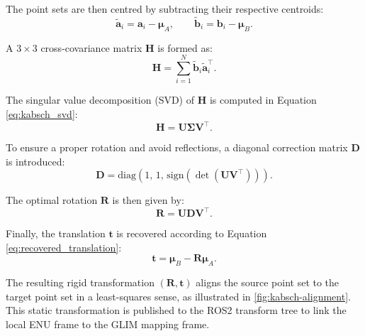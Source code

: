 The point sets are then centred by subtracting their respective centroids:
\begin{equation}
\label{eq:centering}
\tilde{\mathbf{a}}_i = \mathbf{a}_i - \boldsymbol{\mu}_A, \qquad \tilde{\mathbf{b}}_i = \mathbf{b}_i - \boldsymbol{\mu}_B.
\end{equation}

A $3 \times 3$ cross-covariance matrix $\mathbf{H}$ is formed as:
\begin{equation}
\label{eq:cross_covariance}
\mathbf{H} = \sum_{i=1}^N \tilde{\mathbf{b}}_i \tilde{\mathbf{a}}_i^{\top}.
\end{equation}

The singular value decomposition (SVD) of $\mathbf{H}$ is computed in Equation \eqref{eq:kabsch_svd}:
\begin{equation}
\label{eq:kabsch_svd}
\mathbf{H} = \mathbf{U} \boldsymbol{\Sigma} \mathbf{V}^{\top}.
\end{equation}

To ensure a proper rotation and avoid reflections, a diagonal correction matrix $\mathbf{D}$ is introduced:
\begin{equation}
\label{eq:reflection_correction}
\mathbf{D} = \mathrm{diag}(1,\,1,\,\mathrm{sign}(\det(\mathbf{U}\mathbf{V}^{\top}))).
\end{equation}

The optimal rotation $\mathbf{R}$ is then given by:
\begin{equation}
\label{eq:optimal_rotation}
\mathbf{R} = \mathbf{U}\mathbf{D}\mathbf{V}^{\top}.
\end{equation}

Finally, the translation $\mathbf{t}$ is recovered according to Equation \eqref{eq:recovered_translation}:
\begin{equation}
\label{eq:recovered_translation}
\mathbf{t} = \boldsymbol{\mu}_B - \mathbf{R}\boldsymbol{\mu}_A.
\end{equation}

The resulting rigid transformation $(\mathbf{R}, \mathbf{t})$ aligns the source point set to the target point set in a least-squares sense, as illustrated in \cref{fig:kabsch-alignment}. This static transformation is published to the ROS2 transform tree \cite{macenskiRobotOperatingSystem2022} to link the local ENU frame to the GLIM mapping frame.

